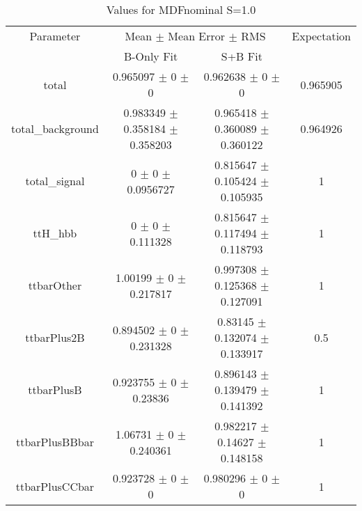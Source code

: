 \begin{table}
\centering
\caption{Values for MDFnominal S=1.0}
\begin{tabular}{cccc}
\toprule
Parameter & \multicolumn{2}{c}{Mean $\pm$ Mean Error $\pm$ RMS} & Expectation\\
 & B-Only Fit & S+B Fit & \\
\midrule
total & \num{0.965097} $\pm$ \num{0} $\pm$ \num{0} & \num{0.962638} $\pm$ \num{0} $\pm$ \num{0} & \num{0.965905}\\
total\_background & \num{0.983349} $\pm$ \num{0.358184} $\pm$ \num{0.358203} & \num{0.965418} $\pm$ \num{0.360089} $\pm$ \num{0.360122} & \num{0.964926}\\
total\_signal & \num{0} $\pm$ \num{0} $\pm$ \num{0.0956727} & \num{0.815647} $\pm$ \num{0.105424} $\pm$ \num{0.105935} & \num{1}\\
ttH\_hbb & \num{0} $\pm$ \num{0} $\pm$ \num{0.111328} & \num{0.815647} $\pm$ \num{0.117494} $\pm$ \num{0.118793} & \num{1}\\
ttbarOther & \num{1.00199} $\pm$ \num{0} $\pm$ \num{0.217817} & \num{0.997308} $\pm$ \num{0.125368} $\pm$ \num{0.127091} & \num{1}\\
ttbarPlus2B & \num{0.894502} $\pm$ \num{0} $\pm$ \num{0.231328} & \num{0.83145} $\pm$ \num{0.132074} $\pm$ \num{0.133917} & \num{0.5}\\
ttbarPlusB & \num{0.923755} $\pm$ \num{0} $\pm$ \num{0.23836} & \num{0.896143} $\pm$ \num{0.139479} $\pm$ \num{0.141392} & \num{1}\\
ttbarPlusBBbar & \num{1.06731} $\pm$ \num{0} $\pm$ \num{0.240361} & \num{0.982217} $\pm$ \num{0.14627} $\pm$ \num{0.148158} & \num{1}\\
ttbarPlusCCbar & \num{0.923728} $\pm$ \num{0} $\pm$ \num{0} & \num{0.980296} $\pm$ \num{0} $\pm$ \num{0} & \num{1}\\
\bottomrule
\end{tabular}
\end{table}